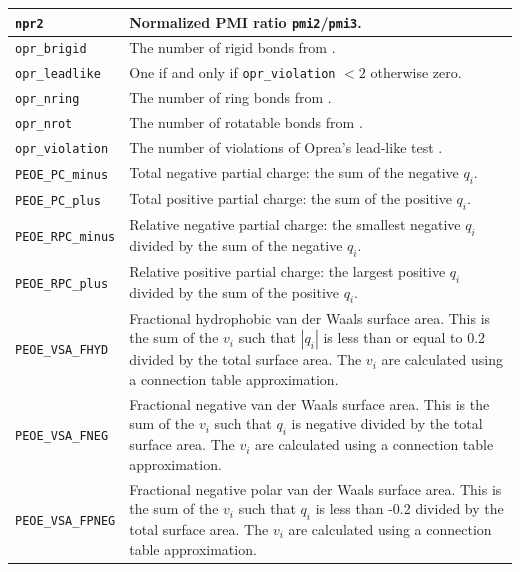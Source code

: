 \documentclass[12pt,a4paper]{article}
\begin{document}
\begin{longtable}{@{\zz}|p{}|p{}|}
\texttt{npr2} & Normalized PMI ratio \texttt{pmi2}/\texttt{pmi3}.\\ \hline

\texttt{opr\_brigid} & The number of rigid bonds from \cite{Oprea2000}.\\ \hline

\texttt{opr\_leadlike} & One if and only if \texttt{opr\_violation} $< 2$ 
otherwise zero.\\ \hline

\texttt{opr\_nring} & The number of ring bonds from \cite{Oprea2000}.\\ \hline

\texttt{opr\_nrot} & The number of rotatable bonds from \cite{Oprea2000}.\\ 
\hline

\texttt{opr\_violation} & The number of violations of Oprea's lead-like test 
\cite{Oprea2000}.\\ \hline

\texttt{PEOE\_PC\_minus} & Total negative partial charge: the sum of the 
negative $q_i$.\\ \hline

\texttt{PEOE\_PC\_plus} & Total positive partial charge: the sum of the 
positive $q_i$.\\ \hline

\texttt{PEOE\_RPC\_minus} & Relative negative partial charge: the smallest 
negative $q_i$ divided by the sum of the negative $q_i$.\\ \hline

\texttt{PEOE\_RPC\_plus} & Relative positive partial charge: the largest 
positive $q_i$ divided by the sum of the positive $q_i$.\\ \hline

\texttt{PEOE\_VSA\_FHYD} & Fractional hydrophobic van der Waals surface 
area. This is the sum of the $v_i$ such that $|q_i|$ is less than or 
equal to 0.2 divided by the total surface area. The $v_i$ are calculated 
using a connection table approximation.\\ \hline

\texttt{PEOE\_VSA\_FNEG} & Fractional negative van der Waals surface area. 
This is the sum of the $v_i$ such that $q_i$ is negative divided by the total 
surface area. The $v_i$ are calculated using a connection table 
approximation.\\ \hline

\texttt{PEOE\_VSA\_FPNEG} & Fractional negative polar van der Waals surface 
area. This is the sum of the $v_i$ such that $q_i$ is less than -0.2 divided 
by the total surface area. The $v_i$ are calculated using a connection 
table approximation.\\ \hline


\end{longtable}
\end{document}
